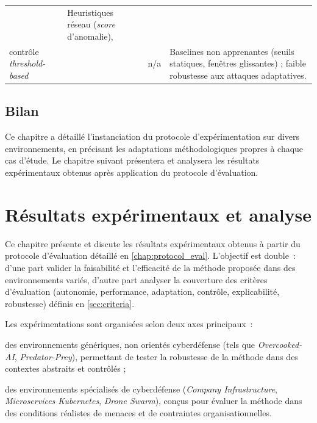 \begin{table}[h!]
\begin{tabularx}{\textwidth}{p{3.8cm}p{3.2cm}p{2.8cm}p{4.5cm}}
                                      & Heuristiques réseau (\textit{score} d’anomalie),                                                                                                                                                                                                               \\contrôle \textit{threshold-based} &  & n/a & Baselines non apprenantes (seuils statiques, fenêtres glissantes) ; faible robustesse aux attaques adaptatives. \\
    \bottomrule
  \end{tabularx}
\end{table}



\section*{Bilan}
Ce chapitre a détaillé l’instanciation du protocole d'expérimentation sur divers environnements, en précisant les adaptations méthodologiques propres à chaque cas d’étude. Le chapitre suivant présentera et analysera les résultats expérimentaux obtenus après application du protocole d'évaluation.

\clearpage
\thispagestyle{empty}
\null
\newpage


\chapter{Résultats expérimentaux et analyse}

Ce chapitre présente et discute les résultats expérimentaux obtenus à partir du protocole d’évaluation détaillé en \autoref{chap:protocol_eval}.
L’objectif est double~: d’une part valider la faisabilité et l’efficacité de la méthode proposée dans des environnements variés, d’autre part analyser la couverture des critères d’évaluation (autonomie, performance, adaptation, contrôle, explicabilité, robustesse) définis en \autoref{sec:criteria}.

Les expérimentations sont organisées selon deux axes principaux~:
\begin{enumerate*}[label={\roman*)}, itemjoin={; \quad}]
  \item des environnements génériques, non orientés cyberdéfense (tels que \textit{Overcooked-AI}, \textit{Predator-Prey}), permettant de tester la robustesse de la méthode dans des contextes abstraits et contrôlés ;
  \item des environnements spécialisés de cyberdéfense (\textit{Company Infrastructure}, \textit{Microservices Kubernetes}, \textit{Drone Swarm}), conçus pour évaluer la méthode dans des conditions réalistes de menaces et de contraintes organisationnelles.
\end{enumerate*}

